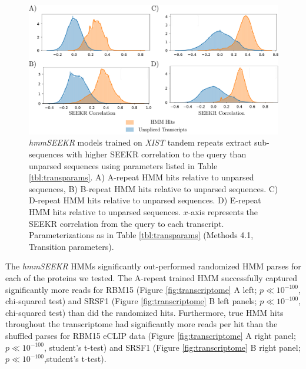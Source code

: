 \begin{figure}[h!]
\centering
\includegraphics[width=.9\textwidth]{images/hmmdist.pdf}
\caption[\emph{hmmSEEKR} extracts sub-sequences with high correlation to query]{\emph{hmmSEEKR} models trained on \emph{XIST} tandem repeats extract sub-sequences with higher SEEKR correlation to the query than unparsed sequences using parameters listed in Table \ref{tbl:transparams}. A) A-repeat HMM hits relative to unparsed sequences, B) B-repeat HMM hits relative to unparsed sequences. C) D-repeat HMM hits relative to unparsed sequences. D) E-repeat HMM hits relative to unparsed sequences. $x$-axis represents the SEEKR correlation from the query to each transcript. Parameterizations as in Table \ref{tbl:transparams} (Methods 4.1, Transition parameters).}
\label{fig:hmmdist}
\end{figure}

The \emph{hmmSEEKR} HMMs significantly out-performed randomized HMM parses for each of the proteins we tested. The A-repeat trained HMM successfully captured significantly more reads for RBM15 (Figure \ref{fig:transcriptome} A left; $p\ll 10^{-100}$, chi-squared test) and SRSF1 (Figure \ref{fig:transcriptome} B left panels; $p\ll 10^{-100}$, chi-squared test) than did the randomized hits. Furthermore, true HMM hits throughout the transcriptome had significantly more reads per hit than the shuffled parses for RBM15 eCLIP data (Figure \ref{fig:transcriptome} A right panel; $p\ll10^{-100}$, student's t-test) and SRSF1 (Figure \ref{fig:transcriptome} B right panel; $p\ll10^{-100}$,student's t-test).

